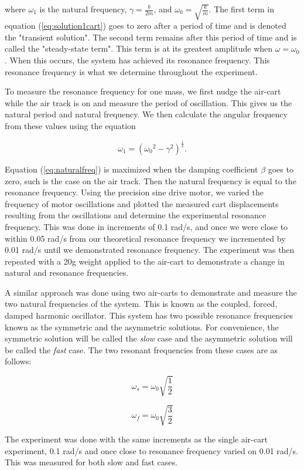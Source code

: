 \noindent where $\omega_1$ is the natural frequency, $\gamma = \frac{b}{2m}$, and $\omega_0 = \sqrt{\frac{k}{m}}$. The first term in equation (\ref{eq:solution1cart}) goes to zero after a period of time and is denoted the "transient solution". The second term remains after this period of time and is called the "steady-state term". This term is at its greatest amplitude when $\omega = \omega_0$. When this occurs, the system has achieved its resonance frequency. This resonance frequency is what we determine throughout the experiment.

\par To measure the resonance frequency for one mass, we first nudge the air-cart while the air track is on and measure the period of oscillation. This gives us the natural period and natural frequency. We then calculate the angular frequency from these values using the equation

\begin{equation}
\omega _1 = ({\omega_0}^2 - \gamma ^ 2)^{\frac{1}{2}}.
\label{eq:naturalfreq}
\end{equation}


\noindent Equation (\ref{eq:naturalfreq}) is maximized when the damping coefficient $\beta$ goes to zero, such is the case on the air track. Then the natural frequency is equal to the resonance frequency. Using the precision sine drive motor, we varied the frequency of motor oscillations and plotted the measured cart displacements resulting from the oscillations and determine the experimental resonance frequency. This was done in increments of 0.1 rad/s, and once we were close to within 0.05 rad/s from our theoretical resonance frequency we incremented by 0.01 rad/s until we demonstrated resonance frequency. The experiment was then repeated with a 20g weight applied to the air-cart to demonstrate a change in natural and resonance frequencies.

\par A similar approach was done using two air-carts to demonstrate and measure the two natural frequencies of the system. This is known as the coupled, forced, damped harmonic oscillator. This system has two possible resonance frequencies known as the symmetric and the asymmetric solutions. For convenience, the symmetric solution will be called the \textit{slow} case and the asymmetric solution will be called the \textit{fast} case. The two resonant frequencies from these cases are as follows:

\begin{equation}
\omega_s = \omega_0 \sqrt{\frac{1}{2}}
\label{eq:slow}
\end{equation}

\begin{equation}
\omega_f = \omega_0 \sqrt{\frac{3}{2}}
\label{eq:fast}
\end{equation}

\noindent The experiment was done with the same increments as the single air-cart experiment, 0.1 rad/s and once close to resonance frequency varied on 0.01 rad/s. This was measured for both slow and fast cases.




